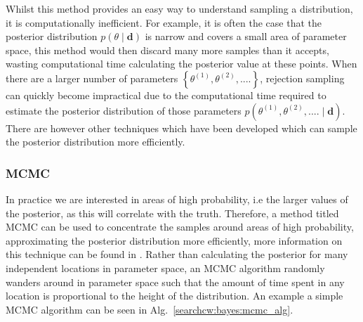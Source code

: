 Whilst this method provides an easy way to understand sampling a distribution, it is computationally inefficient. For example, it is often the case that the posterior distribution $p(\theta \mid \bm{d})$ is narrow and covers a small area of parameter space, this method would then discard many more samples than it accepts, wasting computational time calculating the posterior value at these points. 
When there are a larger number of parameters $\left\{\theta^{(1)},\theta^{(2)}, ....\right\}$, rejection sampling can quickly become impractical due to the computational time required to estimate the posterior distribution of those parameters $p(\theta^{(1)},\theta^{(2)}, .... \mid \bm{d})$.
There are however other techniques which have been developed which can sample the posterior distribution more efficiently.

%
\subsubsection{MCMC}
%

In practice we are interested in areas of high probability, i.e the larger values of the posterior, as this will correlate with the truth.
Therefore, a method titled \gls{MCMC} can be used to concentrate the samples around areas of high probability, approximating the posterior distribution more efficiently, more information on this technique can be found in
\citep{metropolis1953EquationState,vanravenzwaaij2018SimpleIntroduction,sharma2017MarkovChain}.
Rather than calculating the posterior for many independent locations in parameter space, an \gls{MCMC} algorithm randomly wanders around in parameter space such that the amount of time spent in any location is proportional to the height of the distribution.
An example a simple \gls{MCMC} algorithm can be seen in Alg.~\ref{searchcw:bayes:mcmc_alg}.

